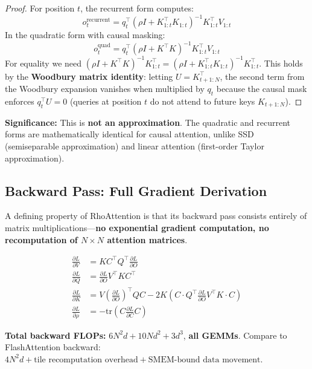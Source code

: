\documentclass[11pt,a4paper]{article}
\theoremstyle{remark}
\begin{document}
\begin{proof}
For position $t$, the recurrent form computes:
\begin{equation}
o_t^{\text{recurrent}} = q_t^\top (\rho I + K_{1:t}^\top K_{1:t})^{-1} K_{1:t}^\top V_{1:t}
\end{equation}
In the quadratic form with causal masking:
\begin{equation}
o_t^{\text{quad}} = q_t^\top (\rho I + K^\top K)^{-1} K_{1:t}^\top V_{1:t}
\end{equation}
For equality we need $(\rho I + K^\top K)^{-1} K_{1:t}^\top = (\rho I + K_{1:t}^\top K_{1:t})^{-1} K_{1:t}^\top$. This holds by the \textbf{Woodbury matrix identity}: letting $U = K_{t+1:N}^\top$, the second term from the Woodbury expansion vanishes when multiplied by $q_t$ because the causal mask enforces $q_t^\top U = 0$ (queries at position $t$ do not attend to future keys $K_{t+1:N}$).
\end{proof}

\textbf{Significance:} This is \textbf{not an approximation}. The quadratic and recurrent forms are mathematically identical for causal attention, unlike SSD (semiseparable approximation) and linear attention (first-order Taylor approximation).

\subsection{Backward Pass: Full Gradient Derivation}

A defining property of RhoAttention is that its backward pass consists entirely of matrix multiplications---\textbf{no exponential gradient computation, no recomputation of $N \times N$ attention matrices}.

\begin{align}
\frac{\partial L}{\partial V} &= K C^\top Q^\top \frac{\partial L}{\partial O} \label{eq:dv} \\
\frac{\partial L}{\partial Q} &= \frac{\partial L}{\partial O} V^\top K C^\top \label{eq:dq} \\
\frac{\partial L}{\partial K} &= V\left(\frac{\partial L}{\partial O}\right)^\top Q C - 2K\left(C \cdot Q^\top \frac{\partial L}{\partial O} V^\top K \cdot C\right) \label{eq:dk} \\
\frac{\partial L}{\partial \rho} &= -\text{tr}\left(C \frac{\partial L}{\partial C} C\right) \label{eq:drho}
\end{align}

\textbf{Total backward FLOPs:} $6N^2 d + 10Nd^2 + 3d^3$, \textbf{all GEMMs}. Compare to FlashAttention backward: $4N^2 d + \text{tile recomputation overhead} + \text{SMEM-bound data movement}$.
\end{document}
